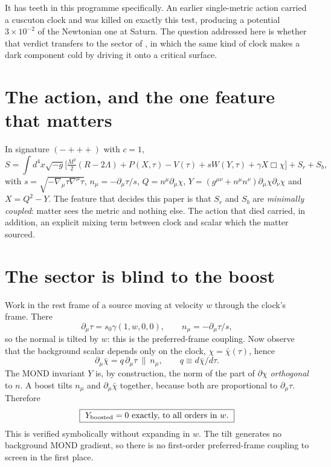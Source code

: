 \documentclass[11pt,letterpaper]{article}
\begin{document}
It has teeth in this programme specifically. An earlier single-metric action \cite{paper13,repo} carried a cuscuton clock and was killed on exactly this test, producing a potential $3\times10^{-2}$ of the Newtonian one at Saturn. The question addressed here is whether that verdict transfers to the sector of \cite{paper19,paper20,paper21}, in which the same kind of clock makes a dark component cold by driving it onto a critical surface.

\section{The action, and the one feature that matters}
In signature $(-{+}{+}{+})$ with $c=1$,
\begin{equation}
S=\int d^4x\sqrt{-g}\Big[\tfrac{M^2}{2}(R-2\Lambda)+P(X,\tau)-V(\tau)+sW(Y,\tau)+\gamma X\Box\chi\Big]+S_r+S_b,
\label{action}
\end{equation}
with $s=\sqrt{-\nabla_\mu\tau\nabla^\mu\tau}$, $n_\mu=-\partial_\mu\tau/s$, $Q=n^\mu\partial_\mu\chi$, $Y=(g^{\mu\nu}+n^\mu n^\nu)\partial_\mu\chi\partial_\nu\chi$ and $X=Q^2-Y$. The feature that decides this paper is that $S_r$ and $S_b$ are \emph{minimally coupled}: matter sees the metric and nothing else. The action that died carried, in addition, an explicit mixing term between clock and scalar which the matter sourced.

\section{The sector is blind to the boost}
Work in the rest frame of a source moving at velocity $w$ through the clock's frame. There
\begin{equation}
\partial_\mu\tau=s_0\gamma(1,w,0,0),\qquad n_\mu=-\partial_\mu\tau/s ,
\end{equation}
so the normal is tilted by $w$: this is the preferred-frame coupling. Now observe that the background scalar depends only on the clock, $\chi=\bar\chi(\tau)$, hence
\begin{equation}
\partial_\mu\bar\chi=q\,\partial_\mu\tau\ \parallel\ n_\mu ,\qquad q\equiv d\bar\chi/d\tau .
\end{equation}
The MOND invariant $Y$ is, by construction, the norm of the part of $\partial\chi$ \emph{orthogonal} to $n$. A boost tilts $n_\mu$ and $\partial_\mu\bar\chi$ together, because both are proportional to $\partial_\mu\tau$. Therefore
\begin{equation}
\boxed{\ Y_{\rm boosted}=0\ \text{exactly, to all orders in }w.\ }
\label{Y}
\end{equation}
This is verified symbolically without expanding in $w$. The tilt generates no background MOND gradient, so there is no first-order preferred-frame coupling to screen in the first place.
\end{document}
